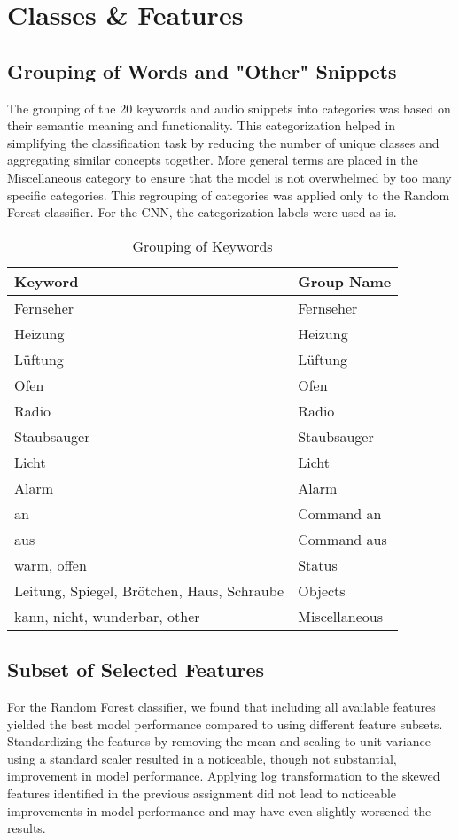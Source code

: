 \section{Classes \& Features}

\subsection{Grouping of Words and "Other" Snippets}
The grouping of the 20 keywords and audio snippets into categories was based on their semantic meaning and functionality. This categorization helped in simplifying the classification task by reducing the number of unique classes and aggregating similar concepts together. More general terms are placed in the Miscellaneous category to ensure that the model is not overwhelmed by too many specific categories. This regrouping of categories was applied only to the Random Forest classifier. For the CNN, the categorization labels were used as-is.

\begin{table}
  \caption{Grouping of Keywords}
  \label{tab:keyword_grouping}
  \centering
  \begin{tabular}{ll}
    \toprule
    Keyword & Group Name \\
    \midrule
    Fernseher & Fernseher \\
    Heizung & Heizung \\
    Lüftung & Lüftung \\
    Ofen & Ofen \\
    Radio & Radio \\
    Staubsauger & Staubsauger \\
    Licht & Licht \\
    Alarm & Alarm \\
    an & Command an \\
    aus & Command aus \\
    warm, offen & Status \\
    Leitung, Spiegel, Brötchen, Haus, Schraube & Objects \\
    kann, nicht, wunderbar, other & Miscellaneous \\
    \bottomrule
  \end{tabular}
\end{table}

\subsection{Subset of Selected Features}
For the Random Forest classifier, we found that including all available features yielded the best model performance compared to using different feature subsets. Standardizing the features by removing the mean and scaling to unit variance using a standard scaler resulted in a noticeable, though not substantial, improvement in model performance. Applying log transformation to the skewed features identified in the previous assignment did not lead to noticeable improvements in model performance and may have even slightly worsened the results.

